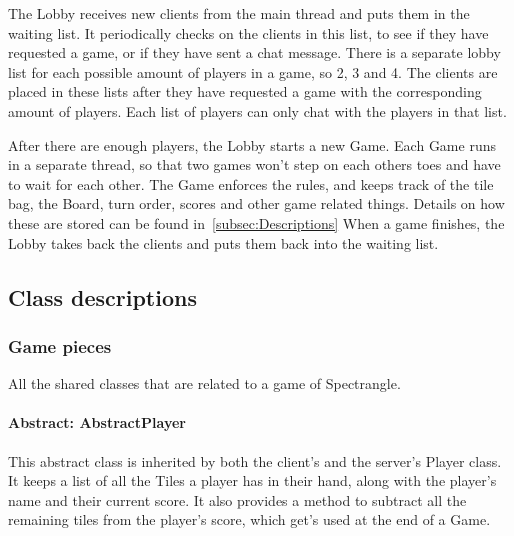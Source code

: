 \documentclass[12pt, letterpaper]{article}
\begin{document}
    The Lobby receives new clients from the main thread and puts them in the waiting list.
    It periodically checks on the clients in this list, to see if they have requested a game, or if they have
    sent a chat message.
    There is a separate lobby list for each possible amount of players in a game, so 2, 3 and 4.
    The clients are placed in these lists after they have requested a game with the corresponding amount of players.
    Each list of players can only chat with the players in that list.

    After there are enough players, the Lobby starts a new Game.
    Each Game runs in a separate thread, so that two games won't step on each others toes
    and have to wait for each other.
    The Game enforces the rules, and keeps track of the tile bag, the Board, turn order, scores and other game
    related things.
    Details on how these are stored can be found in~\autoref{subsec:Descriptions}
    When a game finishes, the Lobby takes back the clients and puts them back into the waiting list.


    \subsection{Class descriptions}
    \label{subsec:Descriptions}


    \subsubsection{Game pieces}

    All the shared classes that are related to a game of Spectrangle.

    \paragraph{Abstract: AbstractPlayer}
    This abstract class is inherited by both the client's and the server's Player class.
    It keeps a list of all the Tiles a player has in their hand, along with the player's name
    and their current score.
    It also provides a method to subtract all the remaining tiles from the player's score, which get's used at the end
    of a Game.
\end{document}
